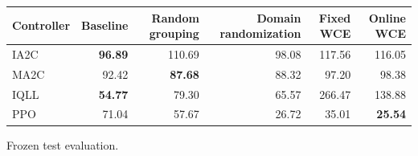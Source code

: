 \begin{tabular}{lrrrrr}
\hline
Controller & Baseline & Random grouping & Domain randomization & Fixed WCE & Online WCE \\
\hline
IA2C & \textbf{96.89} & 110.69 & 98.08 & 117.56 & 116.05 \\
MA2C & 92.42 & \textbf{87.68} & 88.32 & 97.20 & 98.38 \\
IQLL & \textbf{54.77} & 79.30 & 65.57 & 266.47 & 138.88 \\
PPO & 71.04 & 57.67 & 26.72 & 35.01 & \textbf{25.54} \\
\hline
\end{tabular}
Frozen test evaluation.
